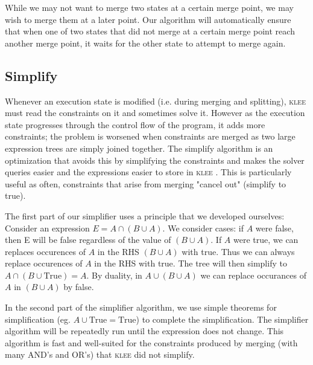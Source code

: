 \documentclass[12pt,a4paper]{article}
\newcommand{\klee}{\textsc{klee }}
\begin{document}
While we may not want to merge two states at a certain merge point, we may wish to merge them at a later point. Our algorithm will automatically ensure that when one of two states that did not merge at a certain merge point reach another merge point, it waits for the other state to attempt to merge again.

\subsection{Simplify}
Whenever an execution state is modified (i.e. during merging and splitting), \klee must read the constraints on it and sometimes solve it. However as the execution state progresses through the control flow of the program, it adds more constraints; the problem is worsened when constraints are merged as two large expression trees are simply joined together. The simplify algorithm is an optimization that avoids this by simplifying the constraints and makes the solver queries easier and the expressions easier to store in \klee. This is particularly useful as often, constraints that arise from merging "cancel out" (simplify to true).

The first part of our simplifier uses a principle that we developed ourselves:
Consider an expression $E = A\cap(B\cup A)$. We consider cases: if $A$ were false, then E will be false regardless of the value of $(B\cup A)$. If $A$ were true, we can replaces occurences of $A$ in the RHS $(B\cup A)$ with true. Thus we can always replace occurences of $A$ in the RHS with true. The tree will then simplify to $A\cap(B\cup \text{True}) = A$. By duality, in $A\cup(B\cup A)$ we can replace occurances of $A$ in $(B\cup A)$ by false.

In the second part of the simplifier algorithm, we use simple theorems for simplification (eg. $A\cup \text{True} = \text{True}$) to complete the simplification. The simplifier algorithm will be repeatedly run until the expression does not change. This algorithm is fast and well-suited for the constraints produced by merging (with many AND's and OR's) that \klee did not simplify.
\end{document}
